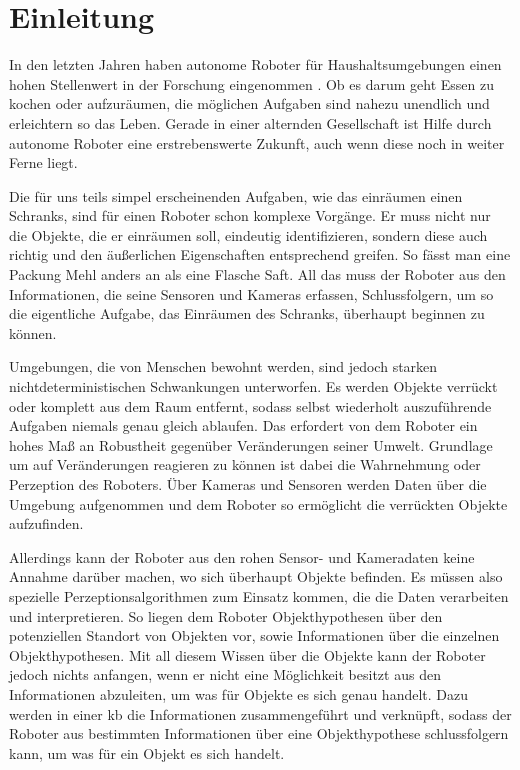 \graphicspath{{./images/}}      
\def\CHAPTERONE{./chapters/Chapter-1} 

\chapter{Einleitung}
\label{chap:introduction}
%	
In den letzten Jahren haben autonome Roboter für Haushaltsumgebungen einen hohen Stellenwert in der Forschung eingenommen . Ob es darum geht Essen zu kochen oder aufzuräumen, die möglichen Aufgaben sind nahezu unendlich und erleichtern so das Leben. Gerade in einer alternden Gesellschaft  ist Hilfe durch autonome Roboter eine erstrebenswerte Zukunft, auch wenn diese noch in weiter Ferne liegt. \par
Die für uns teils simpel erscheinenden Aufgaben, wie das einräumen einen Schranks, sind für einen Roboter schon komplexe Vorgänge. Er muss nicht nur die Objekte, die er einräumen soll, eindeutig identifizieren, sondern diese auch richtig und den äußerlichen Eigenschaften entsprechend greifen. So fässt man eine Packung Mehl anders an als eine Flasche Saft. All das muss der Roboter aus den Informationen, die seine Sensoren und Kameras erfassen, Schlussfolgern, um so die eigentliche Aufgabe, das Einräumen des Schranks, überhaupt beginnen zu können. \par
Umgebungen, die von Menschen bewohnt werden, sind jedoch starken nichtdeterministischen Schwankungen unterworfen. Es werden Objekte verrückt oder komplett aus dem Raum entfernt, sodass selbst wiederholt auszuführende Aufgaben niemals genau gleich ablaufen. Das erfordert von dem Roboter ein hohes Maß an Robustheit gegenüber Veränderungen seiner Umwelt. Grundlage um auf Veränderungen reagieren zu können ist dabei die Wahrnehmung oder Perzeption des Roboters. Über Kameras und Sensoren werden Daten über die Umgebung aufgenommen und dem Roboter so ermöglicht die verrückten Objekte aufzufinden. \par 
Allerdings kann der Roboter aus den rohen Sensor- und Kameradaten keine Annahme darüber machen, wo sich überhaupt Objekte befinden. Es müssen also spezielle Perzeptionsalgorithmen zum Einsatz kommen, die die Daten verarbeiten und interpretieren. So liegen dem Roboter Objekthypothesen über den potenziellen Standort von Objekten vor, sowie Informationen über die einzelnen Objekthypothesen. Mit all diesem Wissen über die Objekte kann der Roboter jedoch nichts anfangen, wenn er nicht eine Möglichkeit besitzt aus den Informationen abzuleiten, um was für Objekte es sich genau handelt. Dazu werden in einer \gls{kb} die Informationen zusammengeführt und verknüpft, sodass der Roboter aus bestimmten Informationen über eine Objekthypothese schlussfolgern kann, um was für ein Objekt es sich handelt.    \par    
